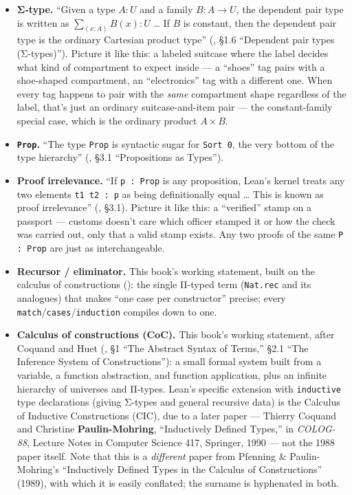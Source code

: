 \begin{itemize}
\tightlist
\item
  \textbf{Σ-type.} ``Given a type \(A : U\) and a family \(B : A \to U\), the dependent pair type is written as \(\sum_{(x:A)} B(x) : U\) \ldots{} If \(B\) is constant, then the dependent pair type is the ordinary Cartesian product type'' (\cite{HoTT2013}, §1.6 ``Dependent pair types (Σ-types)''). Picture it like this: a labeled suitcase where the label decides what kind of compartment to expect inside --- a ``shoes'' tag pairs with a shoe-shaped compartment, an ``electronics'' tag with a different one. When every tag happens to pair with the \emph{same} compartment shape regardless of the label, that's just an ordinary suitcase-and-item pair --- the constant-family special case, which is the ordinary product \(A \times B\).
\item
  \textbf{\texttt{Prop}.} ``The type \texttt{Prop} is syntactic sugar for \texttt{Sort 0}, the very bottom of the type hierarchy'' (\cite{TPIL4}, §3.1 ``Propositions as Types'').
\item
  \textbf{Proof irrelevance.} ``If \texttt{p : Prop} is any proposition, Lean's kernel treats any two elements \texttt{t1 t2 : p} as being definitionally equal \ldots{} This is known as proof irrelevance'' (\cite{TPIL4}, §3.1). Picture it like this: a ``verified'' stamp on a passport --- customs doesn't care which officer stamped it or how the check was carried out, only that a valid stamp exists. Any two proofs of the same \texttt{P : Prop} are just as interchangeable.
\item
  \textbf{Recursor / eliminator.} This book's working statement, built on the calculus of constructions (\cite{CoquandHuet1988}): the single Π-typed term (\texttt{Nat.rec} and its analogues) that makes ``one case per constructor'' precise; every \texttt{match}/\texttt{cases}/\texttt{induction} compiles down to one.
\item
  \textbf{Calculus of constructions (CoC).} This book's working statement, after Coquand and Huet (\cite{CoquandHuet1988}, §1 ``The Abstract Syntax of Terms,'' §2.1 ``The Inference System of Constructions''): a small formal system built from a variable, a function abstraction, and function application, plus an infinite hierarchy of universes and Π-types. Lean's specific extension with \texttt{inductive} type declarations (giving Σ-types and general recursive data) is the Calculus of Inductive Constructions (CIC), due to a later paper --- Thierry Coquand and Christine \textbf{Paulin-Mohring}, ``Inductively Defined Types,'' in \emph{COLOG-88}, Lecture Notes in Computer Science 417, Springer, 1990 --- not the 1988 paper itself. Note that this is a \emph{different} paper from Pfenning \& Paulin-Mohring's ``Inductively Defined Types in the Calculus of Constructions'' (1989), with which it is easily conflated; the surname is hyphenated in both.

\end{itemize}
